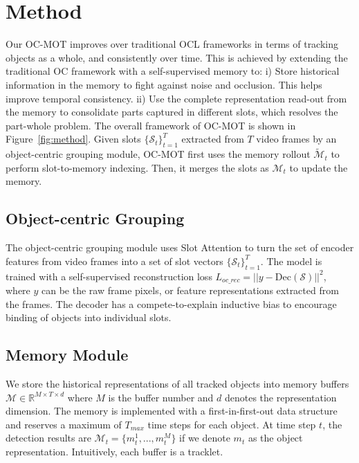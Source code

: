 \section{Method}


Our OC-MOT improves over traditional OCL frameworks in terms of tracking objects as a whole, and consistently over time. This is achieved by extending the traditional OC framework with a self-supervised memory to: i) Store historical information in the memory to fight against noise and occlusion. This helps improve temporal consistency. ii) Use the complete representation read-out from the memory to consolidate parts captured in different slots, which resolves the part-whole problem. The overall framework of OC-MOT is shown in Figure~\ref{fig:method}. 
Given slots $\{\mathcal{S}_t\}_{t=1}^{T}$ extracted from $T$ video frames by an object-centric grouping module, OC-MOT first uses the memory rollout $\tilde {\mathcal{M}}_t$ to perform slot-to-memory indexing. Then, it merges the slots as $\mathcal{M}_t$ to update the memory. 

\subsection{Object-centric Grouping}
The object-centric grouping module uses Slot Attention\cite{locatello2020object} to turn the set of encoder features from video frames  into a set of slot vectors $\{\mathcal{S}_t\}_{t=1}^{T}$. The model is trained with a self-supervised reconstruction loss $L_{oc\_rec}=||y - \text{Dec}(\mathcal{S})||^2$, where $y$ can be the raw frame pixels, or feature representations extracted from the frames. The decoder has a compete-to-explain inductive bias to encourage binding of objects into individual slots. 



\subsection{Memory Module}

We store the historical representations of all tracked objects into memory buffers $\mathcal{M} \in \mathbb{R}^{M\times T \times d}$ where $M$ is the buffer number and $d$ denotes the representation dimension. The memory is implemented with a first-in-first-out data structure and reserves a maximum of $T_{max}$ time steps for each object. At time step $t$, the detection results are $\mathcal{M}_t = \{m_t^1,...,m_t^M \}$ if we denote $m_t$ as the object representation. 
Intuitively, each buffer is a tracklet.


